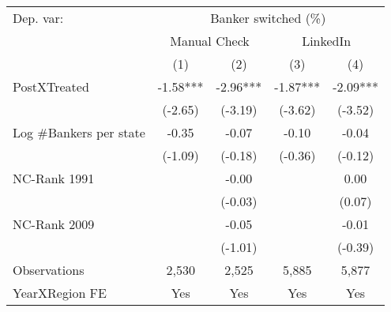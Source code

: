 {
\def\sym#1{\ifmmode^{#1}\else\(^{#1}\)\fi}
\begin{tabular*}{\hsize}{@{\hskip\tabcolsep\extracolsep\fill}l*{4}{c}}
\toprule
               Dep. var: & \multicolumn{4}{c}{Banker switched (\%)} \\ &\multicolumn{2}{c}{Manual Check}&\multicolumn{2}{c}{LinkedIn}\\\cmidrule(lr){2-3}\cmidrule(lr){4-5}
                &\multicolumn{1}{c}{(1)}   &\multicolumn{1}{c}{(2)}   &\multicolumn{1}{c}{(3)}   &\multicolumn{1}{c}{(4)}   \\
\midrule
PostXTreated    &    -1.58***&    -2.96***&    -1.87***&    -2.09***\\
                &  (-2.65)   &  (-3.19)   &  (-3.62)   &  (-3.52)   \\
 
Log \#Bankers per state&    -0.35   &    -0.07   &    -0.10   &    -0.04   \\
                &  (-1.09)   &  (-0.18)   &  (-0.36)   &  (-0.12)   \\
 
NC-Rank 1991    &            &    -0.00   &            &     0.00   \\
                &            &  (-0.03)   &            &   (0.07)   \\
 
NC-Rank 2009    &            &    -0.05   &            &    -0.01   \\
                &            &  (-1.01)   &            &  (-0.39)   \\
\midrule
Observations    &    2,530   &    2,525   &    5,885   &    5,877   \\
YearXRegion FE  &      Yes   &      Yes   &      Yes   &      Yes   \\
\bottomrule
\end{tabular*}
}
